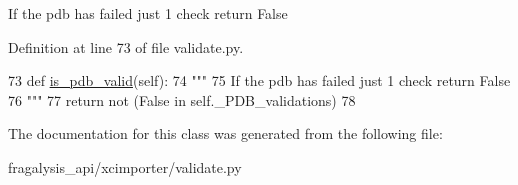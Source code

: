 \begin{DoxyVerb}If the pdb has failed just 1 check return False
\end{DoxyVerb}
 

Definition at line 73 of file validate.\+py.


\begin{DoxyCode}
73     \textcolor{keyword}{def }\hyperlink{classfragalysis__api_1_1xcimporter_1_1validate_1_1_validate_p_d_b_a7e6b2f1b0ea513e4485fabb411c5f3f5}{is\_pdb\_valid}(self):
74         \textcolor{stringliteral}{"""}
75 \textcolor{stringliteral}{        If the pdb has failed just 1 check return False}
76 \textcolor{stringliteral}{        """}
77         \textcolor{keywordflow}{return} \textcolor{keywordflow}{not} (\textcolor{keyword}{False} \textcolor{keywordflow}{in} self.\_PDB\_validations)
78 
\end{DoxyCode}


The documentation for this class was generated from the following file\+:\begin{DoxyCompactItemize}
\item 
fragalysis\+\_\+api/xcimporter/validate.\+py\end{DoxyCompactItemize}
